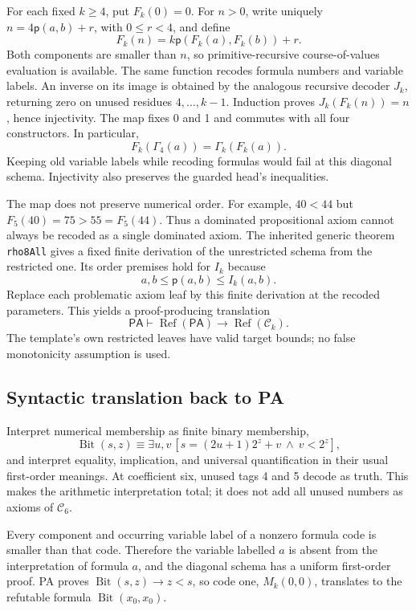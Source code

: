 \documentclass[10pt,letterpaper]{article}
\newcommand{\PA}{\mathsf{PA}}
\newcommand{\Refut}{\operatorname{Ref}}
\newcommand{\pair}{\mathsf p}
\newcommand{\file}[1]{\nolinkurl{#1}}
\begin{document}
For each fixed $k\ge4$, put $F_k(0)=0$. For $n>0$, write uniquely
$n=4\pair(a,b)+r$, with $0\le r<4$, and define
\[
                F_k(n)=k\pair(F_k(a),F_k(b))+r.
\]
Both components are smaller than $n$, so primitive-recursive
course-of-values evaluation is available. The same function recodes
formula numbers and variable labels. An inverse on its image is obtained
by the analogous recursive decoder $J_k$, returning zero on unused
residues $4,\ldots,k-1$. Induction proves $J_k(F_k(n))=n$, hence injectivity.
The map fixes 0 and 1 and commutes with all four constructors. In particular,
\[
                   F_k(\Gamma_4(a))=\Gamma_k(F_k(a)).
\]
Keeping old variable labels while recoding formulas would fail at this
diagonal schema. Injectivity also preserves the guarded head's inequalities.

The map does not preserve numerical order. For example,
$40<44$ but $F_5(40)=75>55=F_5(44)$. Thus a dominated propositional
axiom cannot always be recoded as a single dominated axiom. The inherited
generic theorem \file{rho8All} gives a fixed finite derivation of the
unrestricted schema from the restricted one\cite{restricted}. Its order
premises hold for $I_k$ because
\[
                 a,b\le\pair(a,b)\le I_k(a,b).
\]
Replace each problematic axiom leaf by this finite derivation at the
recoded parameters. This yields a proof-producing translation
\[
       \PA\vdash \Refut(\PA)\longrightarrow\Refut(\mathcal C_k).
\]
The template's own restricted leaves have valid target bounds; no false
monotonicity assumption is used.

\subsection{Syntactic translation back to PA}

Interpret numerical membership as finite binary membership,
\[
 \operatorname{Bit}(s,z)\equiv
 \exists u,v\,[s=(2u+1)2^z+v\ \wedge\ v<2^z],
\]
and interpret equality, implication, and universal quantification in their
usual first-order meanings. At coefficient six, unused tags 4 and 5 decode
as truth. This makes the arithmetic interpretation total; it does not add
all unused numbers as axioms of $\mathcal C_6$.

Every component and occurring variable label of a nonzero formula code is
smaller than that code. Therefore the variable labelled $a$ is absent from
the interpretation of formula $a$, and the diagonal schema has a uniform
first-order proof. PA proves $\operatorname{Bit}(s,z)\to z<s$, so code one,
$M_k(0,0)$, translates to the refutable formula
$\operatorname{Bit}(x_0,x_0)$.
\end{document}
